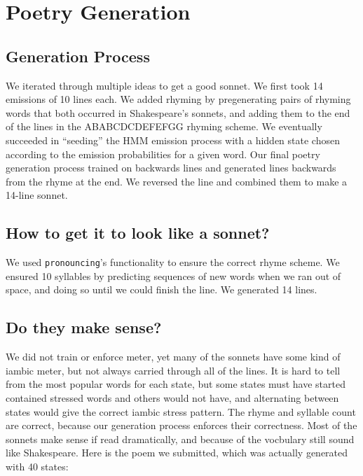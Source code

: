 \section{Poetry Generation}
\subsection{Generation Process}
We iterated through multiple ideas to get a good sonnet. We first took 14 emissions of 10 lines each. We added rhyming by pregenerating pairs of rhyming words that both occurred in Shakespeare's sonnets, and adding them to the end of the lines in the ABABCDCDEFEFGG rhyming scheme. We eventually succeeded in ``seeding'' the HMM emission process with a hidden state chosen according to the emission probabilities for a given word. Our final poetry generation process trained on backwards lines and generated lines backwards from the rhyme at the end. We reversed the line and combined them to make a 14-line sonnet.
\subsection{How to get it to look like a sonnet?}
We used {\tt pronouncing}'s functionality to ensure the correct rhyme scheme. We ensured 10 syllables by predicting sequences of new words when we ran out of space, and doing so until we could finish the line. We generated 14 lines.
\subsection{Do they make sense?}
We did not train or enforce meter, yet many of the sonnets have some kind of iambic meter, but not always carried through all of the lines. It is hard to tell from the most popular words for each state, but some states must have started contained stressed words and others would not have, and alternating between states would give the correct iambic stress pattern. The rhyme and syllable count are correct, because our generation process enforces their correctness. Most of the sonnets make sense if read dramatically, and because of the vocbulary still sound like Shakespeare. Here is the poem we submitted, which was actually generated with 40 states:\\

